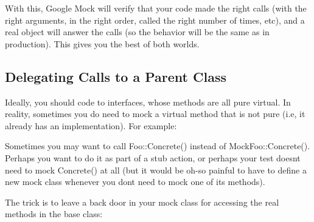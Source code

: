 With this, Google Mock will verify that your code made the right calls (with the right arguments, in the right order, called the right number of times, etc), and a real object will answer the calls (so the behavior will be the same as in production). This gives you the best of both worlds.

\subsection*{Delegating Calls to a Parent Class}

Ideally, you should code to interfaces, whose methods are all pure virtual. In reality, sometimes you do need to mock a virtual method that is not pure (i.\+e, it already has an implementation). For example\+:


\begin{DoxyCode}{0}
\DoxyCodeLine{}
\DoxyCodeLine{\};}
\DoxyCodeLine{}
\DoxyCodeLine{\};}
\end{DoxyCode}


Sometimes you may want to call {\ttfamily Foo\+::\+Concrete()} instead of {\ttfamily Mock\+Foo\+::\+Concrete()}. Perhaps you want to do it as part of a stub action, or perhaps your test doesn\textquotesingle{}t need to mock {\ttfamily Concrete()} at all (but it would be oh-\/so painful to have to define a new mock class whenever you don\textquotesingle{}t need to mock one of its methods).

The trick is to leave a back door in your mock class for accessing the real methods in the base class\+:


\begin{DoxyCode}{0}
\DoxyCodeLine{}
\DoxyCodeLine{\};}
\end{DoxyCode}


